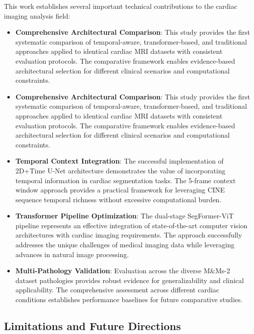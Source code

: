 \documentclass[twoside,11pt]{article}
\begin{document}
  This work establishes several important technical contributions to the cardiac imaging analysis field:
  \begin{itemize}
    \item \textbf{Comprehensive Architectural Comparison}: This study provides the first systematic comparison of temporal-aware, transformer-based, and traditional approaches applied to identical cardiac MRI datasets with consistent evaluation protocols. The comparative framework enables evidence-based architectural selection for different clinical scenarios and computational constraints.

    \item \textbf{Comprehensive Architectural Comparison}: This study provides the first systematic comparison of temporal-aware, transformer-based, and traditional approaches applied to identical cardiac MRI datasets with consistent evaluation protocols. The comparative framework enables evidence-based architectural selection for different clinical scenarios and computational constraints.
    
    \item \textbf{Temporal Context Integration}: The successful implementation of 2D+Time U-Net architecture demonstrates the value of incorporating temporal information in cardiac segmentation tasks. The 5-frame context window approach provides a practical framework for leveraging CINE sequence temporal richness without excessive computational burden.
    
    \item \textbf{Transformer Pipeline Optimization}: The dual-stage SegFormer-ViT pipeline represents an effective integration of state-of-the-art computer vision architectures with cardiac imaging requirements. The approach successfully addresses the unique challenges of medical imaging data while leveraging advances in natural image processing.
    
    \item \textbf{Multi-Pathology Validation}: Evaluation across the diverse M\&Ms-2 dataset pathologies provides robust evidence for generalizability and clinical applicability. The comprehensive assessment across different cardiac conditions establishes performance baselines for future comparative studies.
    
  \end{itemize}
  
  \subsection{Limitations and Future Directions}
  
\end{document}
